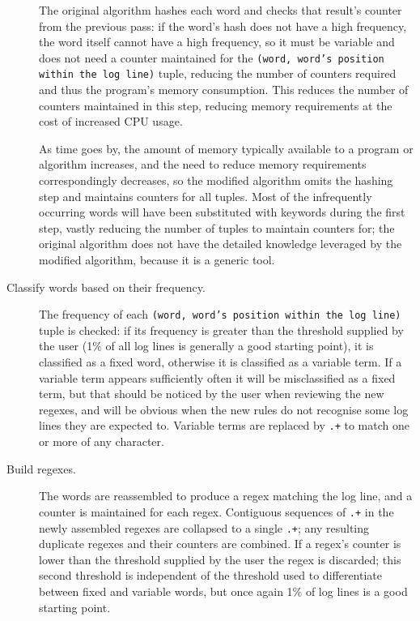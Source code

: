 \begin{description}
        The original algorithm hashes each word and checks that result's
        counter from the previous pass: if the word's hash does not have a
        high frequency, the word itself cannot have a high frequency, so it
        must be variable and does not need a counter maintained for the
        \texttt{(word, word's position within the log line)} tuple,
        reducing the number of counters required and thus the program's
        memory consumption.  This reduces the number of counters maintained
        in this step, reducing memory requirements at the cost of increased
        CPU usage.

        As time goes by, the amount of memory typically available to a
        program or algorithm increases, and the need to reduce memory
        requirements correspondingly decreases, so the modified algorithm
        omits the hashing step and maintains counters for all tuples.  Most
        of the infrequently occurring words will have been substituted with
        keywords during the first step, vastly reducing the number of
        tuples to maintain counters for; the original algorithm does not
        have the detailed knowledge leveraged by the modified algorithm,
        because it is a generic tool.

    \item [Classify words based on their frequency.]  The frequency of each
        \texttt{(word, word's position within the log line)} tuple is
        checked: if its frequency is greater than the threshold supplied by
        the user (1\% of all log lines is generally a good starting point),
        it is classified as a fixed word, otherwise it is classified as a
        variable term.  If a variable term appears sufficiently often it
        will be misclassified as a fixed term, but that should be noticed
        by the user when reviewing the new regexes, and will be obvious
        when the new rules do not recognise some log lines they are
        expected to.  Variable terms are replaced by \texttt{.+} to match
        one or more of any character.

    \item [Build regexes.]  The words are reassembled to produce a regex
        matching the log line, and a counter is maintained for each regex.
        Contiguous sequences of \texttt{.+} in the newly assembled regexes
        are collapsed to a single \texttt{.+}; any resulting duplicate
        regexes and their counters are combined.  If a regex's counter is
        lower than the threshold supplied by the user the regex is
        discarded; this second threshold is independent of the threshold
        used to differentiate between fixed and variable words, but once
        again 1\% of log lines is a good starting point.


\end{description}
